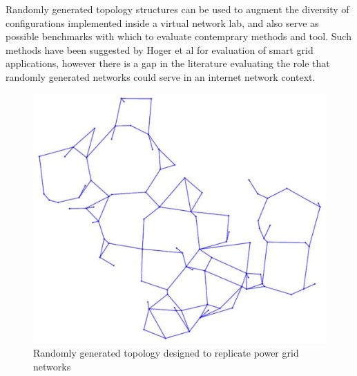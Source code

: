 Randomly generated topology structures can be used to augment the diversity of configurations implemented inside a virtual network lab, and also serve as possible benchmarks with which to evaluate contemprary methods and tool. \cite{random_power_grid_topo} Such methods have been suggested by Hoger et al for evaluation of smart grid applications, however there is a gap in the literature evaluating the role that randomly generated networks could serve in an internet network context. 
\begin{figure}
    \centering
    \includegraphics[width=0.5\linewidth]{images/lit_review_top.png}
    \caption{Randomly generated topology designed to replicate power grid networks \cite{random_power_grid_topo}}
    \label{fig:enter-label}
\end{figure}



\newpage